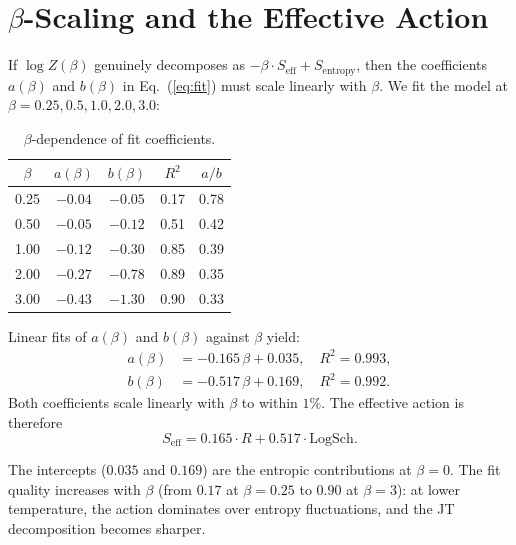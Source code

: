 \documentclass[aps,prd,twocolumn,superscriptaddress]{revtex4-2}
\begin{document}
\section{$\beta$-Scaling and the Effective Action}
\label{sec:beta}

If $\log Z(\beta)$ genuinely decomposes as
$-\beta \cdot S_{\mathrm{eff}} + S_{\mathrm{entropy}}$, then the
coefficients $a(\beta)$ and $b(\beta)$ in Eq.~(\ref{eq:fit}) must
scale linearly with $\beta$. We fit the model at
$\beta = 0.25, 0.5, 1.0, 2.0, 3.0$:

\begin{table}[h]
\caption{$\beta$-dependence of fit coefficients.}
\label{tab:beta}
\begin{ruledtabular}
\begin{tabular}{ccccc}
$\beta$ & $a(\beta)$ & $b(\beta)$ & $R^2$ & $a/b$ \\
\midrule
0.25 & $-0.04$ & $-0.05$ & 0.17 & 0.78 \\
0.50 & $-0.05$ & $-0.12$ & 0.51 & 0.42 \\
1.00 & $-0.12$ & $-0.30$ & 0.85 & 0.39 \\
2.00 & $-0.27$ & $-0.78$ & 0.89 & 0.35 \\
3.00 & $-0.43$ & $-1.30$ & 0.90 & 0.33 \\
\end{tabular}
\end{ruledtabular}
\end{table}

Linear fits of $a(\beta)$ and $b(\beta)$ against $\beta$ yield:
\begin{align}
a(\beta) &= -0.165\,\beta + 0.035, \quad R^2 = 0.993, \\
b(\beta) &= -0.517\,\beta + 0.169, \quad R^2 = 0.992.
\end{align}
Both coefficients scale linearly with $\beta$ to within $1\%$. The
effective action is therefore
\begin{equation}
\label{eq:Seff}
\boxed{S_{\mathrm{eff}} = 0.165 \cdot R + 0.517 \cdot \mathrm{LogSch}.}
\end{equation}

The intercepts ($0.035$ and $0.169$) are the entropic contributions
at $\beta = 0$. The fit quality increases with $\beta$ (from $0.17$
at $\beta = 0.25$ to $0.90$ at $\beta = 3$): at lower temperature,
the action dominates over entropy fluctuations, and the JT
decomposition becomes sharper.
\end{document}
